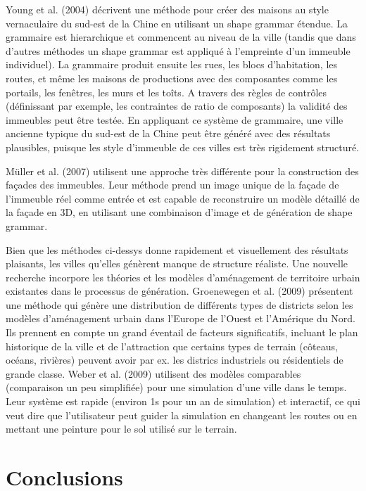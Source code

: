 \documentclass[11pt]{report}
\begin{document}
Young et al. (2004) décrivent une méthode pour créer des maisons au style vernaculaire du sud-est de la Chine en utilisant un shape grammar étendue. La grammaire est hierarchique et commencent au niveau de la ville (tandis que dans d'autres méthodes un shape grammar est appliqué à l'empreinte d'un immeuble individuel). La grammaire produit ensuite les rues, les blocs d'habitation, les routes, et même les maisons de productions avec des composantes comme les portails, les fenêtres, les murs et les toîts. A travers des règles de contrôles (définissant par exemple, les contraintes de ratio de composants) la validité des immeubles peut être testée. En appliquant ce système de grammaire, une ville ancienne typique du sud-est de la Chine peut être généré avec des résultats plausibles, puisque les style d'immeuble de ces villes est très rigidement structuré. \newline

Müller et al. (2007) utilisent une approche très différente pour la construction des façades des immeubles. Leur méthode prend un image unique de la façade de l'immeuble réel comme entrée et est capable de reconstruire un modèle détaillé de la façade en 3D, en utilisant une combinaison d'image et de génération de shape grammar. \newline

Bien que les méthodes ci-dessys donne rapidement et visuellement des résultats plaisants, les villes qu'elles génèrent manque de structure réaliste. Une nouvelle recherche incorpore les théories et les modèles d'aménagement de territoire urbain existantes dans le processus de génération. Groenewegen et al. (2009) présentent une méthode qui génère une distribution de différents types de districts selon les modèles d'aménagement urbain dans l'Europe de l'Ouest et l'Amérique du Nord. Ils prennent en compte un grand éventail de facteurs significatifs, incluant le plan historique de la ville et de l'attraction que certains types de terrain (côteaus, océans, rivières) peuvent avoir par ex. les districs industriels ou résidentiels de grande classe. Weber et al. (2009) utilisent des modèles comparables (comparaison un peu simplifiée) pour une simulation d'une ville dans le temps. Leur système est rapide (environ 1s pour un an de simulation) et interactif, ce qui veut dire que l'utilisateur peut guider la simulation en changeant les routes ou en mettant une peinture pour le sol utilisé sur le terrain.

\section{Conclusions}
\end{document}

